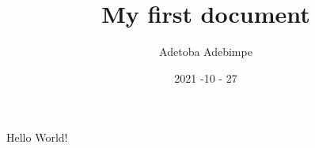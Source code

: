 \documentclass{article}
\title{My first document}
\date{2021 -10 - 27}
\author{Adetoba Adebimpe}
\begin{document}
	\maketitle
	\newpage
	Hello World!
	
\end{document}
